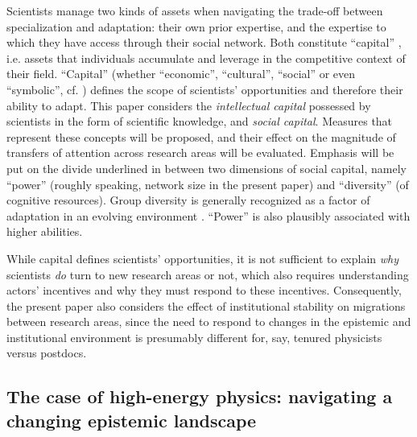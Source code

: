 \documentclass{article}
\begin{document}
Scientists manage two kinds of assets when navigating the trade-off between specialization and adaptation: their own prior expertise, and the expertise to which they have access through their social network. Both constitute ``capital'' \citep{Bourdieu1986}, i.e. assets that individuals accumulate and leverage in the competitive context of their field. ``Capital''  (whether ``economic'', ``cultural'', ``social'' or even ``symbolic'', cf. \citealt{Bourdieu1986}) defines the scope of scientists' opportunities and therefore their ability to adapt. This paper considers the \textit{intellectual capital} possessed by scientists in the form of scientific knowledge, and \textit{social capital}. %
Measures that represent these concepts will be proposed, and their effect on the magnitude of transfers of attention across research areas will be evaluated. Emphasis will be put on the divide underlined in \citealt{Abbasi2014} between two dimensions of social capital, namely ``power'' (roughly speaking, network size in the present paper) and ``diversity'' (of cognitive resources). Group diversity is generally recognized as a factor of adaptation in an evolving environment \citep{Schimmelpfennig2021,Muthukrishna2016,page2008difference}. ``Power'' is also plausibly associated with higher abilities.

While capital defines scientists' opportunities, it is not sufficient to explain \textit{why} scientists \textit{do} turn to new research areas or not, which also requires understanding actors' incentives and why they must respond to these incentives. Consequently, the present paper also considers the effect of institutional stability on migrations between research areas, since the need to respond to changes in the epistemic and institutional environment is presumably different for, say, tenured physicists versus postdocs. %


\subsection{\label{sec:hep}The case of high-energy physics: navigating a changing epistemic landscape}
\end{document}
